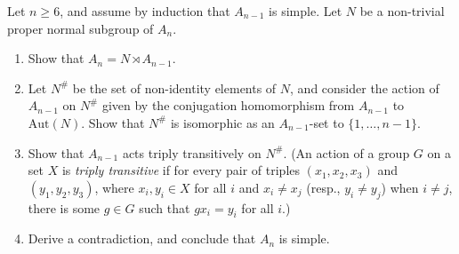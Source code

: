 \documentclass[../Odyssey_Project.tex]{subfiles}
\begin{document}
\begin{exercise}
\label{ex:7.8}
Let $n \geq 6$, and assume by induction that $A_{n-1}$ is simple. Let $N$ be a non-trivial proper normal subgroup of $A_n$.
\begin{enumerate}
    \item[(a)] Show that $A_n = N \rtimes A_{n-1}$.
    \item[(b)] Let $N^{\#}$ be the set of non-identity elements of $N$, and consider the action of $A_{n-1}$ on $N^{\#}$ given by the conjugation homomorphism from $A_{n-1}$ to $\mathrm{Aut}(N)$. Show that $N^{\#}$ is isomorphic as an $A_{n-1}$-set to $\{1, \ldots, n-1\}$.
    \item[(c)] Show that $A_{n-1}$ acts triply transitively on $N^{\#}$. (An action of a group $G$ on a set $X$ is \emph{triply transitive} if for every pair of triples $(x_1, x_2, x_3)$ and $(y_1, y_2, y_3)$, where $x_i, y_i \in X$ for all $i$ and $x_i \neq x_j$ (resp., $y_i \neq y_j$) when $i \neq j$, there is some $g \in G$ such that $gx_i = y_i$ for all $i$.)
    \item[(d)] Derive a contradiction, and conclude that $A_n$ is simple.
\end{enumerate}
\end{exercise}
\end{document}

